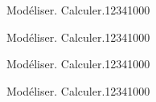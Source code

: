 \begin{pageParcoursd} 

\begin{ExoCd}{Modéliser. Calculer.}{1234}{1}{0}{0}{0}


\end{ExoCd}

 

\begin{ExoCd}{Modéliser. Calculer.}{1234}{1}{0}{0}{0}


\end{ExoCd}


\end{pageParcoursd}
\begin{pageParcourst}

\begin{ExoCt}{Modéliser. Calculer.}{1234}{1}{0}{0}{0}


\end{ExoCt}


 


\end{pageParcourst}
\begin{pageAuto} 

\begin{ExoAuto}{Modéliser. Calculer.}{1234}{1}{0}{0}{0}


\end{ExoAuto}

  
\end{pageAuto}
 
